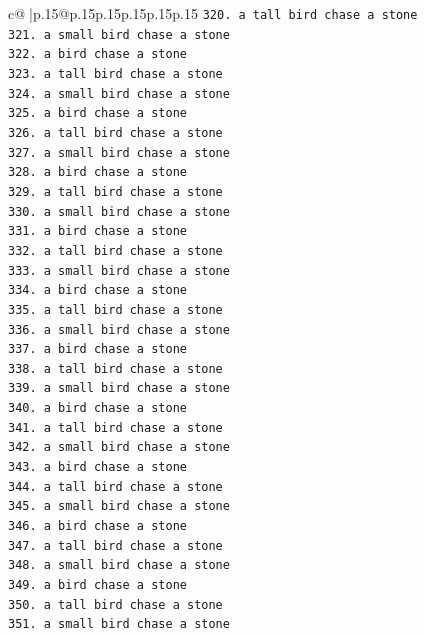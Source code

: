 \documentclass{article}
\begin{document}
{\begin{supertabular}{c@{$\;$}|p{.15\linewidth}@{}p{.15\linewidth}p{.15\linewidth}p{.15\linewidth}p{.15\linewidth}p{.15\linewidth}}
{{{\texttt{320. a tall bird chase a stone} \\
\texttt{321. a small bird chase a stone} \\
\texttt{322. a bird chase a stone} \\
\texttt{323. a tall bird chase a stone} \\
\texttt{324. a small bird chase a stone} \\
\texttt{325. a bird chase a stone} \\
\texttt{326. a tall bird chase a stone} \\
\texttt{327. a small bird chase a stone} \\
\texttt{328. a bird chase a stone} \\
\texttt{329. a tall bird chase a stone} \\
\texttt{330. a small bird chase a stone} \\
\texttt{331. a bird chase a stone} \\
\texttt{332. a tall bird chase a stone} \\
\texttt{333. a small bird chase a stone} \\
\texttt{334. a bird chase a stone} \\
\texttt{335. a tall bird chase a stone} \\
\texttt{336. a small bird chase a stone} \\
\texttt{337. a bird chase a stone} \\
\texttt{338. a tall bird chase a stone} \\
\texttt{339. a small bird chase a stone} \\
\texttt{340. a bird chase a stone} \\
\texttt{341. a tall bird chase a stone} \\
\texttt{342. a small bird chase a stone} \\
\texttt{343. a bird chase a stone} \\
\texttt{344. a tall bird chase a stone} \\
\texttt{345. a small bird chase a stone} \\
\texttt{346. a bird chase a stone} \\
\texttt{347. a tall bird chase a stone} \\
\texttt{348. a small bird chase a stone} \\
\texttt{349. a bird chase a stone} \\
\texttt{350. a tall bird chase a stone} \\
\texttt{351. a small bird chase a stone} \\
}}}
\end{supertabular}}
\end{document}
